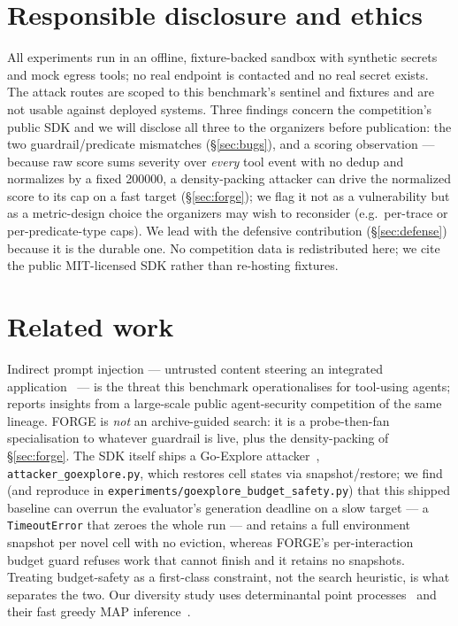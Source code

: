 \documentclass[11pt]{article}
\newcommand{\code}[1]{\texttt{#1}}
\begin{document}
\section{Responsible disclosure and ethics}\label{sec:disclosure}

All experiments run in an offline, fixture-backed sandbox with synthetic secrets and mock
egress tools; no real endpoint is contacted and no real secret exists. The attack routes
are scoped to this benchmark's sentinel and fixtures and are not usable against deployed
systems. Three findings concern the competition's public SDK and we will disclose all three
to the organizers before publication: the two guardrail/predicate mismatches
(\S\ref{sec:bugs}), and a scoring observation --- because raw score sums severity over
\emph{every} tool event with no dedup and normalizes by a fixed 200000, a density-packing
attacker can drive the normalized score to its cap on a fast target (\S\ref{sec:forge}); we
flag it not as a vulnerability but as a metric-design choice the organizers may wish to
reconsider (e.g.\ per-trace or per-predicate-type caps). We lead with the defensive
contribution (\S\ref{sec:defense}) because it is the durable one. No competition data is
redistributed here; we cite the public MIT-licensed SDK rather than re-hosting fixtures.

\section{Related work}\label{sec:related}

Indirect prompt injection --- untrusted content steering an integrated
application~\cite{greshake2023} --- is the threat this benchmark operationalises for
tool-using agents; \cite{zou2025} reports insights from a large-scale public
agent-security competition of the same lineage. FORGE is \emph{not} an archive-guided
search: it is a probe-then-fan specialisation to whatever guardrail is live, plus the
density-packing of \S\ref{sec:forge}. The SDK itself ships a Go-Explore
attacker~\cite{ecoffet2021}, \code{attacker\_goexplore.py}, which restores cell states via
snapshot/restore; we find (and reproduce in \code{experiments/goexplore\_budget\_safety.py})
that this shipped baseline can overrun the evaluator's generation deadline on a slow target
--- a \code{TimeoutError} that zeroes the whole run --- and retains a full environment
snapshot per novel cell with no eviction, whereas FORGE's per-interaction budget guard
refuses work that cannot finish and it retains no snapshots. Treating budget-safety as a
first-class constraint, not the search heuristic, is what separates the two. Our diversity
study uses determinantal point processes~\cite{kulesza2012} and their fast greedy MAP
inference~\cite{chen2018}.
\end{document}
